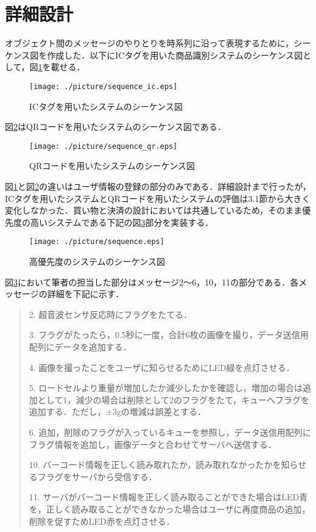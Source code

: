 

\section{詳細設計}

オブジェクト間のメッセージのやりとりを時系列に沿って表現するために，シーケンス図を作成した．以下にICタグを用いた商品識別システムのシーケンス図として，図\ref{sequence_ic}を載せる．

\begin{figure}[htbp]
\centering
\texttt{[image: ./picture/sequence\_ic.eps]}
\caption{ICタグを用いたシステムのシーケンス図}
\label{sequence_ic}
\end{figure}


図\ref{sequence_qr}はQRコードを用いたシステムのシーケンス図である．


\begin{figure}[htbp]
\centering
\texttt{[image: ./picture/sequence\_qr.eps]}
\caption{QRコードを用いたシステムのシーケンス図}
\label{sequence_qr}
\end{figure}


図\ref{sequence_ic}と図\ref{sequence_qr}の違いはユーザ情報の登録の部分のみである．詳細設計まで行ったが，ICタグを用いたシステムとQRコードを用いたシステムの評価は3.1節から大きく変化しなかった．買い物と決済の設計においては共通しているため，そのまま優先度の高いシステムである下記の図\ref{sequence}部分を実装する．



\begin{figure}[htbp]
\centering
\texttt{[image: ./picture/sequence.eps]}
\caption{高優先度のシステムのシーケンス図}
\label{sequence}
\end{figure}


図\ref{sequence}において筆者の担当した部分はメッセージ2～6，10，11の部分である．各メッセージの詳細を下記に示す．


\begin{quote}
2. 超音波センサ反応時にフラグをたてる．

3. フラグがたったら，0.5秒に一度，合計6枚の画像を撮り，データ送信用配列にデータを追加する．

4. 画像を撮ったことをユーザに知らせるためにLED緑を点灯させる．

5. ロードセルより重量が増加したか減少したかを確認し，増加の場合は追加として1，減少の場合は削除として2のフラグをたて，キューへフラグを追加する．ただし，±3gの増減は誤差とする．

6. 追加，削除のフラグが入っているキューを参照し，データ送信用配列にフラグ情報を追加し，画像データと合わせてサーバへ送信する．

10. バーコード情報を正しく読み取れたか，読み取れなかったかを知らせるフラグをサーバから受信する．

11. サーバがバーコード情報を正しく読み取ることができた場合はLED青を，正しく読み取ることができなかった場合はユーザに再度商品の追加，削除を促すためLED赤を点灯させる．
\end{quote}


